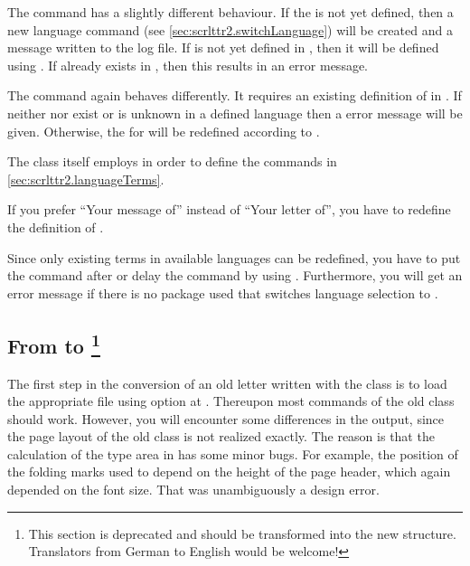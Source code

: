 The command  has a slightly different behaviour.
If the  is not yet defined, then a new language
command (see \autoref{sec:scrlttr2.switchLanguage}) will be created
and a message written to the log file.  If  is not yet
defined in , then it will be defined using
.  If  already exists in
, then this results in an error message.

The command  again behaves differently. It
requires an existing definition of  in .
If neither  nor  exist or  is
unknown in a defined language then a error message will be
given. Otherwise, the  for  will be
redefined according to .

The class  itself employs 
in order to define the commands in
\autoref{sec:scrlttr2.languageTerms}.
\begin{Example}
  If you prefer ``Your message of'' instead of ``Your letter of'', you
  have to redefine the definition of .
\begin{lstcode}
\end{lstcode}
  
Since only existing terms in available languages can be redefined, you
have to put the command after  or
delay the command by using . Furthermore, you
will get an error message if there is no package used that switches
language selection to .
\end{Example}
%
%
%
%
%
%
%


\subsection{From  to \protect\footnote{This section is
  deprecated and should be transformed into the new structure. Translators
  from German to English would be welcome!}}
\label{sec:scrlttr2-experts.fromscrlettr}

The first step in the conversion of an old letter written with the
 class is to load the appropriate  file
using option  at .  Thereupon
most commands of the old class should work.  However, you will
encounter some differences in the output, since the page layout of the
old class is not realized exactly. The reason is that the calculation
of the type area in  has some minor bugs. For example,
the position of the folding marks used to depend on the height of the
page header, which again depended on the font size. That was
unambiguously a design error.

